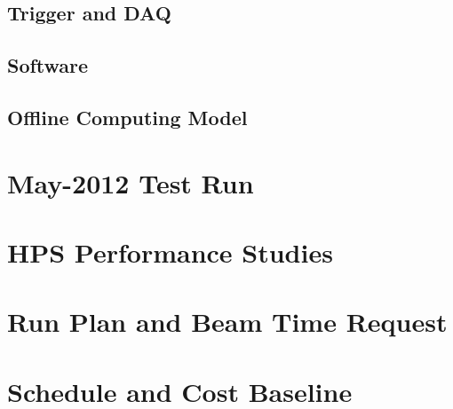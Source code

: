 \documentclass[prc,12pt,nofootinbib]{revtex4}
\begin{document}
\maketitle
\clearpage

\tableofcontents
\clearpage






\clearpage





\clearpage






\clearpage


\clearpage


\clearpage


\clearpage


\subsection{Trigger and DAQ }


\subsection{Software}


\subsection{Offline Computing Model}


\section{May-2012 Test Run}
\label{sec:testrun2012}

\clearpage

\section{HPS Performance Studies}
\label{sec:performance}


\clearpage




\section{Run Plan and Beam Time Request}


\section{Schedule and Cost Baseline}



\clearpage



\clearpage


\end{document}
